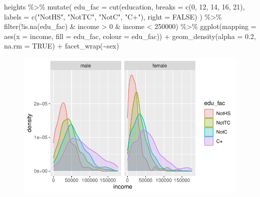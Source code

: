 \documentclass[
  letterpaper,
  DIV=11,
  numbers=noendperiod]{scrartcl}
\newenvironment{Shaded}{\begin{snugshade}}{\end{snugshade}}
\newcommand{\AttributeTok}[1]{\textcolor[rgb]{0.40,0.45,0.13}{#1}}
\newcommand{\ConstantTok}[1]{\textcolor[rgb]{0.56,0.35,0.01}{#1}}
\newcommand{\DecValTok}[1]{\textcolor[rgb]{0.68,0.00,0.00}{#1}}
\newcommand{\FloatTok}[1]{\textcolor[rgb]{0.68,0.00,0.00}{#1}}
\newcommand{\FunctionTok}[1]{\textcolor[rgb]{0.28,0.35,0.67}{#1}}
\newcommand{\NormalTok}[1]{\textcolor[rgb]{0.00,0.23,0.31}{#1}}
\newcommand{\SpecialCharTok}[1]{\textcolor[rgb]{0.37,0.37,0.37}{#1}}
\newcommand{\StringTok}[1]{\textcolor[rgb]{0.13,0.47,0.30}{#1}}
\begin{document}
\begin{Shaded}
\begin{Highlighting}[]
\NormalTok{heights }\SpecialCharTok{\%\textgreater{}\%} 
  \FunctionTok{mutate}\NormalTok{(}
    \AttributeTok{edu\_fac =} \FunctionTok{cut}\NormalTok{(education, }
                  \AttributeTok{breaks =} \FunctionTok{c}\NormalTok{(}\DecValTok{0}\NormalTok{, }\DecValTok{12}\NormalTok{, }\DecValTok{14}\NormalTok{, }\DecValTok{16}\NormalTok{, }\DecValTok{21}\NormalTok{), }
                  \AttributeTok{labels =} \FunctionTok{c}\NormalTok{(}\StringTok{"NotHS"}\NormalTok{, }\StringTok{"NotTC"}\NormalTok{, }\StringTok{"NotC"}\NormalTok{, }\StringTok{"C+"}\NormalTok{),}
                  \AttributeTok{right =} \ConstantTok{FALSE}\NormalTok{) }
\NormalTok{  ) }\SpecialCharTok{\%\textgreater{}\%} 
  \FunctionTok{filter}\NormalTok{(}\SpecialCharTok{!}\FunctionTok{is.na}\NormalTok{(edu\_fac) }\SpecialCharTok{\&}\NormalTok{ income }\SpecialCharTok{\textgreater{}} \DecValTok{0}  \SpecialCharTok{\&}\NormalTok{ income }\SpecialCharTok{\textless{}} \DecValTok{250000}\NormalTok{) }\SpecialCharTok{\%\textgreater{}\%}
  \FunctionTok{ggplot}\NormalTok{(}\AttributeTok{mapping =} \FunctionTok{aes}\NormalTok{(}\AttributeTok{x =}\NormalTok{ income, }\AttributeTok{fill =}\NormalTok{ edu\_fac, }\AttributeTok{colour =}\NormalTok{ edu\_fac)) }\SpecialCharTok{+}
  \FunctionTok{geom\_density}\NormalTok{(}\AttributeTok{alpha =} \FloatTok{0.2}\NormalTok{, }\AttributeTok{na.rm =} \ConstantTok{TRUE}\NormalTok{) }\SpecialCharTok{+} 
  \FunctionTok{facet\_wrap}\NormalTok{(}\SpecialCharTok{\textasciitilde{}}\NormalTok{sex)}
\end{Highlighting}
\end{Shaded}

\begin{figure}[H]

{\centering \includegraphics{EDA_files/figure-pdf/unnamed-chunk-19-1.pdf}

}

\end{figure}
\end{document}
